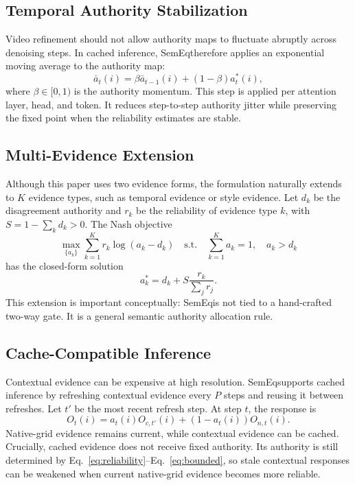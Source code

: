 \documentclass[10pt,twocolumn]{article}
\newcommand{\method}{SemEq}
\begin{document}
\subsection{Temporal Authority Stabilization}

Video refinement should not allow authority maps to fluctuate abruptly across denoising steps. In cached inference, \method therefore applies an exponential moving average to the authority map:
\begin{equation}
    \bar a_t(i)=
    \beta\bar a_{t-1}(i)+(1-\beta)a_t^*(i),
    \label{eq:momentum}
\end{equation}
where $\beta\in[0,1)$ is the authority momentum. This step is applied per attention layer, head, and token. It reduces step-to-step authority jitter while preserving the fixed point when the reliability estimates are stable.

\subsection{Multi-Evidence Extension}

Although this paper uses two evidence forms, the formulation naturally extends to $K$ evidence types, such as temporal evidence or style evidence. Let $d_k$ be the disagreement authority and $r_k$ be the reliability of evidence type $k$, with $S=1-\sum_k d_k>0$. The Nash objective
\begin{equation}
    \max_{\{a_k\}}
    \sum_{k=1}^{K} r_k\log(a_k-d_k)
    \quad
    \text{s.t.}\quad
    \sum_{k=1}^{K}a_k=1,\quad a_k>d_k
\end{equation}
has the closed-form solution
\begin{equation}
    a_k^*=d_k+S\frac{r_k}{\sum_j r_j}.
    \label{eq:multi}
\end{equation}
This extension is important conceptually: \method is not tied to a hand-crafted two-way gate. It is a general semantic authority allocation rule.

\subsection{Cache-Compatible Inference}

Contextual evidence can be expensive at high resolution. \method supports cached inference by refreshing contextual evidence every $P$ steps and reusing it between refreshes. Let $t'$ be the most recent refresh step. At step $t$, the response is
\begin{equation}
    O_t(i)=
    a_t(i)O_{c,t'}(i)
    +(1-a_t(i))O_{n,t}(i).
    \label{eq:cached}
\end{equation}
Native-grid evidence remains current, while contextual evidence can be cached. Crucially, cached evidence does not receive fixed authority. Its authority is still determined by Eq.~\eqref{eq:reliability}--Eq.~\eqref{eq:bounded}, so stale contextual responses can be weakened when current native-grid evidence becomes more reliable.
\end{document}
